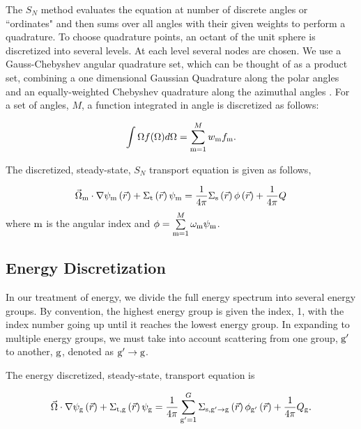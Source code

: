 The $S_N$ method evaluates the equation at number of discrete angles or ``ordinates" and then sums over all angles with their given weights to perform a quadrature. To choose quadrature points, an octant of the unit sphere is discretized into several levels. At each level several nodes are chosen. We use a Gauss-Chebyshev angular quadrature set, which can be thought of as a product set, combining a one dimensional Gaussian Quadrature along the polar angles and an equally-weighted Chebyshev quadrature along the azimuthal angles \cite{jarrel-thesis}. For a set of angles, $M$, a function integrated in angle is discretized as follows:

\begin{equation}
\int \Omega f(\Omega) d\Omega = \sum\limits_{\mathrm{m}=1}^{M} w_{\mathrm{m}} f_{\mathrm{m}}.    
\end{equation}






The discretized, steady-state, $S_N$ transport equation is given as follows,

 \begin{equation}
  \vec{\Omega}_{\mathrm{m}} \cdot \nabla \psi_{\mathrm{m}} \left(\vec{r}\right)+ \Sigma_{\mathrm{t}}\left(\vec{r}\right)\psi_{\mathrm{m}} = \frac{1}{4 \pi} \Sigma_{\mathrm{s}}\left(\vec{r}\right) \phi\left(\vec{r}\right) + \frac{1}{4 \pi} Q
  \label{eq:transport-angular}
 \end{equation}
where $\mathrm{m}$ is the angular index and $\phi = \sum\limits_{\mathrm{m}=1}^M \omega_{\mathrm{m}} \psi_{\mathrm{m}}$.

\subsection{Energy Discretization}
In our treatment of energy, we divide the full energy spectrum into several energy groups. By convention, the highest energy group is given the index, 1, with the index number going up until it reaches the lowest energy group. In expanding to multiple energy groups, we must take into account scattering from one group, $\mathrm{g}'$ to another, $\mathrm{g}$, denoted as $\mathrm{g}' \rightarrow \mathrm{g} $. 

The energy discretized, steady-state, transport equation is

 \begin{equation}
  \vec{\Omega} \cdot \nabla \psi_{\mathrm{g}} \left(\vec{r}\right)+ \Sigma_{\mathrm{t}, \mathrm{g}}\left(\vec{r}\right)\psi_{\mathrm{g}} = \frac{1}{4 \pi} \sum\limits_{\mathrm{g}'=1}^{G}\Sigma_{\mathrm{s}, \mathrm{g}' \rightarrow \mathrm{g}}\left(\vec{r}\right) \phi_{\mathrm{g}'}\left(\vec{r}\right) + \frac{1}{4 \pi} Q_{\mathrm{g}}.
  \label{eq:transport-energy}
 \end{equation}


